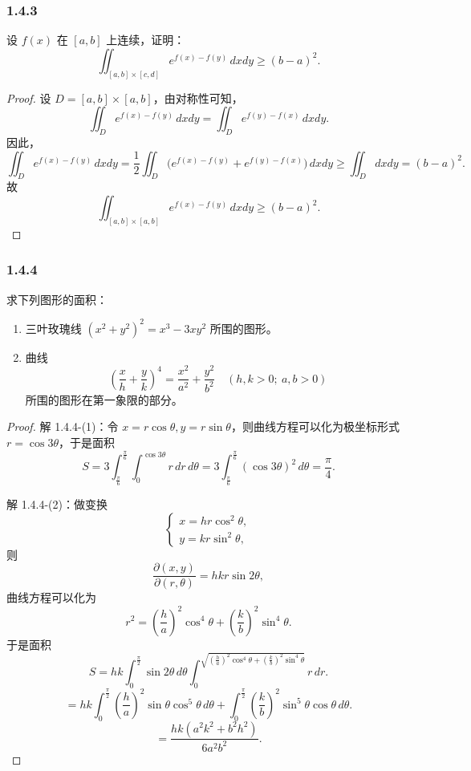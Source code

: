 \documentclass[12pt]{ctexart}
\begin{document}
\subsubsection*{1.4.3}
设 $f(x)$ 在 $[a, b]$ 上连续，证明：
\[
\iint_{[a,b] \times [c,d]} e^{f(x) - f(y)} \, dxdy \geq (b-a)^2.
\]

\begin{proof}
设 $D = [a, b] \times [a, b]$，由对称性可知，
\[
\iint_D e^{f(x) - f(y)} \, dxdy = \iint_D e^{f(y) - f(x)} \, dxdy.
\]
因此，
\[
\iint_D e^{f(x) - f(y)} \, dxdy = \frac{1}{2} \iint_D \big(e^{f(x) - f(y)} + e^{f(y) - f(x)}\big) \, dxdy \geq \iint_D dxdy = (b-a)^2.
\]
故
\[
\iint_{[a,b] \times [a,b]} e^{f(x) - f(y)} \, dxdy \geq (b-a)^2.
\]
\end{proof}

\subsubsection*{1.4.4}
求下列图形的面积：
\begin{enumerate}
    \item 三叶玫瑰线 $(x^2 + y^2)^2 = x^3 - 3xy^2$ 所围的图形。
    \item 曲线
    \[
    \left(\frac{x}{h} + \frac{y}{k}\right)^4 = \frac{x^2}{a^2} + \frac{y^2}{b^2} \quad (h, k > 0; \ a, b > 0)
    \]
    所围的图形在第一象限的部分。
\end{enumerate}

\begin{proof}

	解 1.4.4-(1)：令 $x = r\cos\theta, y = r\sin\theta$，则曲线方程可以化为极坐标形式 $r = \cos 3\theta$，于是面积
\[
S = 3 \int_{\frac{\pi}{6}}^{\frac{\pi}{6}} \int_0^{\cos 3\theta} r \, dr \, d\theta 
= 3 \int_{\frac{\pi}{6}}^{\frac{\pi}{6}} (\cos 3\theta)^2 \, d\theta = \frac{\pi}{4}.
\]

解 1.4.4-(2)：做变换
\[
\begin{cases}
x = hr\cos^2\theta, \\ 
y = kr\sin^2\theta,
\end{cases}
\]
则
\[
\frac{\partial (x, y)}{\partial (r, \theta)} = hkr\sin 2\theta,
\]
曲线方程可以化为
\[
r^2 = \left(\frac{h}{a}\right)^2 \cos^4\theta + \left(\frac{k}{b}\right)^2 \sin^4\theta.
\]
于是面积
\[
S = hk \int_0^{\frac{\pi}{2}} \sin 2\theta \, d\theta \int_0^{\sqrt{\left(\frac{h}{a}\right)^2 \cos^4\theta + \left(\frac{k}{b}\right)^2 \sin^4\theta}} r \, dr.
\]
\[
= hk \int_0^{\frac{\pi}{2}} \left(\frac{h}{a}\right)^2 \sin\theta\cos^5\theta \, d\theta + \int_0^{\frac{\pi}{2}} \left(\frac{k}{b}\right)^2 \sin^5\theta\cos\theta \, d\theta.
\]
\[
= \frac{hk(a^2k^2 + b^2h^2)}{6a^2b^2}.
\]

\end{proof}
\end{document}
